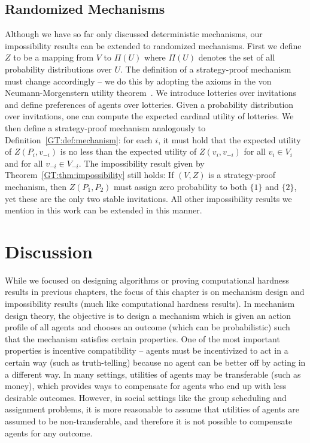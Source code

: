 \subsection{Randomized Mechanisms} \label{GT:sec:randomized}
Although we have so far only discussed deterministic mechanisms, our impossibility results can be extended to randomized mechanisms. First we define $Z$ to be a mapping from $V$ to $\Pi(U)$ where $\Pi(U)$ denotes the set of all probability distributions over $U$. The definition of a strategy-proof mechanism must change accordingly -- we do this by adopting the axioms in the von Neumann-Morgenstern utility theorem~\cite{von1947theory}. We introduce lotteries over invitations and define preferences of agents over lotteries. Given a probability distribution over invitations, one can compute the expected cardinal utility of lotteries. We then define a strategy-proof mechanism analogously to Definition~\ref{GT:def:mechanism}: for each $i$, it must hold that the expected utility of $Z(P_i, v_{-i})$ is no less than the expected utility of $Z(v_i, v_{-i})$ for all $v_i\in V_i$ and for all $v_{-i} \in V_{-i}$. The impossibility result given by Theorem~\ref{GT:thm:impossibility} still holds: If $(V, Z)$ is a strategy-proof mechanism, then $Z(P_1, P_2)$ must assign zero probability to both $\{1\}$ and $\{2\}$, yet these are the only two stable invitations.  All other impossibility results we mention in this work can be extended in this manner.



\section{Discussion}

While we focused on designing algorithms or proving computational hardness results in previous chapters, the focus of this chapter is on mechanism design and impossibility results (much like computational hardness results). In mechanism design theory, the objective is to design a mechanism which is given an action profile of all agents and chooses an outcome (which can be probabilistic) such that the mechanism satisfies certain properties. One of the most important properties is incentive compatibility -- agents must be incentivized to act in a certain way (such as truth-telling) because no agent can be better off by acting in a different way. In many settings, utilities of agents may be transferable (such as money), which provides ways to compensate for agents who end up with less desirable outcomes. However, in social settings like the group scheduling and assignment problems, it is more reasonable to assume that utilities of agents are assumed to be non-transferable, and therefore it is not possible to compensate agents for any outcome. 


